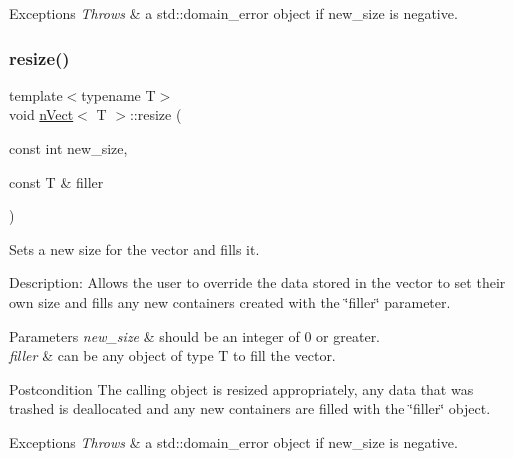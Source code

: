\begin{DoxyExceptions}{Exceptions}
{\em Throws} & a std\+::domain\+\_\+error object if new\+\_\+size is negative. \\
\hline
\end{DoxyExceptions}
\mbox{\label{classnVect_a58dcec4cc5ea9d8d18e03fb1671bee2b}} 
\subsubsection{\texorpdfstring{resize()}{resize()}\hspace{0.1cm}{\footnotesize\ttfamily [2/2]}}
{\footnotesize\ttfamily template$<$typename T$>$ \\
void \hyperlink{classnVect}{n\+Vect}$<$ T $>$\+::resize (\begin{DoxyParamCaption}\item[{const int}]{new\+\_\+size,  }\item[{const T \&}]{filler }\end{DoxyParamCaption})}



Sets a new size for the vector and fills it. 

Description\+: Allows the user to override the data stored in the vector to set their own size and fills any new containers created with the \char`\"{}filler\char`\"{} parameter. 
\begin{DoxyParams}{Parameters}
{\em new\+\_\+size} & should be an integer of 0 or greater. \\
\hline
{\em filler} & can be any object of type T to fill the vector. \\
\hline
\end{DoxyParams}
\begin{DoxyPostcond}{Postcondition}
The calling object is resized appropriately, any data that was trashed is deallocated and any new containers are filled with the \char`\"{}filler\char`\"{} object. 
\end{DoxyPostcond}

\begin{DoxyExceptions}{Exceptions}
{\em Throws} & a std\+::domain\+\_\+error object if new\+\_\+size is negative. \\
\hline
\end{DoxyExceptions}
\mbox{\label{classnVect_a5cf871204b41c5cd97055b3c4ee9607c}} 
